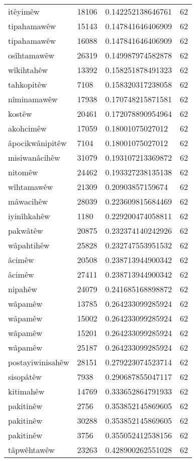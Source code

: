 \begin{longtable}{llll}
itêyimêw & 18106 & 0.142252138646761 & 62\\
tipahamawêw & 15143 & 0.147841646406909 & 62\\
tipahamawêw & 16088 & 0.147841646406909 & 62\\
osîhtamawêw & 26319 & 0.149987974582878 & 62\\
wîkihtahêw & 13392 & 0.158251878491323 & 62\\
tahkopitêw & 7108 & 0.158320317238058 & 62\\
nîminamawêw & 17938 & 0.170748215871581 & 62\\
kostêw & 20461 & 0.172078890954964 & 62\\
akohcimêw & 17059 & 0.18001075027012 & 62\\
âpocikwânipitêw & 7104 & 0.18001075027012 & 62\\
misiwanâcihêw & 31079 & 0.193107213369872 & 62\\
nitomêw & 24462 & 0.193327238135138 & 62\\
wîhtamawêw & 21309 & 0.20903857159674 & 62\\
mâwacihêw & 28039 & 0.223609815684469 & 62\\
iyinîhkahêw & 1180 & 0.229200474058811 & 62\\
pakwâtêw & 20875 & 0.232374140242926 & 62\\
wâpahtihêw & 25828 & 0.232747553951532 & 62\\
âcimêw & 20508 & 0.238713944900342 & 62\\
âcimêw & 27411 & 0.238713944900342 & 62\\
nipahêw & 24079 & 0.241685168898872 & 62\\
wâpamêw & 13785 & 0.264233099285924 & 62\\
wâpamêw & 15002 & 0.264233099285924 & 62\\
wâpamêw & 15201 & 0.264233099285924 & 62\\
wâpamêw & 25187 & 0.264233099285924 & 62\\
postayiwinisahêw & 28151 & 0.279223074523714 & 62\\
sisopâtêw & 7938 & 0.290687855047117 & 62\\
kitimahêw & 14769 & 0.333652864791933 & 62\\
pakitinêw & 2756 & 0.353852145869605 & 62\\
pakitinêw & 30288 & 0.353852145869605 & 62\\
pakitinêw & 3756 & 0.355052412538156 & 62\\
tâpwêhtawêw & 23263 & 0.428900262551028 & 62\\

\end{longtable}
